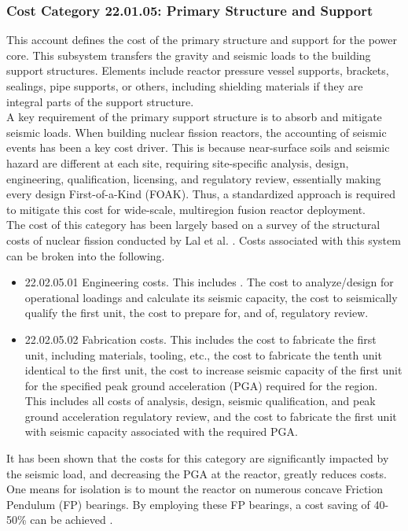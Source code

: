 \subsubsection*{Cost Category 22.01.05:  Primary Structure and Support}
\label{sec:22.1.5}
This account defines the cost of the primary structure and support for the power core. This subsystem  transfers the gravity and seismic loads to the building support structures. Elements include reactor pressure vessel supports, brackets, sealings, pipe supports, or others, including shielding materials if they are integral parts of the support structure. \\

A key requirement of the primary support structure is to absorb and mitigate seismic loads. When building nuclear fission reactors, the accounting of seismic events has been a key cost driver. This is because near-surface soils and seismic hazard are different at each site, requiring site-specific analysis, design, engineering, qualification, licensing, and regulatory review, essentially making every design First-of-a-Kind (FOAK). Thus, a standardized approach is required to mitigate this cost for wide-scale, multiregion fusion reactor deployment. \\

The cost of this category has been largely based on a survey of the structural costs of nuclear fission conducted by Lal et al. \cite{lal2022towards}. Costs associated with this system can be broken into the following. 
\begin{itemize}
    \item 22.02.05.01 Engineering costs. This includes . The cost to analyze/design for operational loadings and calculate its seismic capacity, the cost to seismically qualify the first unit, the cost to prepare for, and of, regulatory review.
    \item 22.02.05.02 Fabrication costs. This includes the cost to fabricate the first unit, including materials, tooling, etc., the cost to fabricate the tenth unit identical to the first unit, the cost to increase seismic capacity of the first unit for the specified peak ground acceleration (PGA) required for the region. This includes all costs of analysis, design, seismic qualification, and peak ground acceleration regulatory review, and the cost to fabricate the first unit with seismic capacity associated with the required PGA. 
\end{itemize}

It has been shown \cite{lal2022towards} that the costs for this category are significantly impacted by the seismic load, and decreasing the PGA at the reactor, greatly reduces costs. One means for isolation is to mount the reactor on numerous concave Friction Pendulum (FP) bearings. By employing these FP bearings, a cost saving of 40-50\% can be achieved \cite{lal2022towards}.\\

